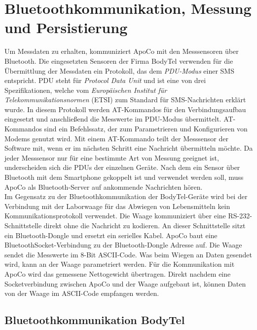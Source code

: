 

\section{Bluetoothkommunikation, Messung und Persistierung} 

Um Messdaten zu erhalten, kommuniziert ApoCo mit den Messsensoren \"uber Bluetooth.
Die eingesetzten Sensoren der Firma BodyTel verwenden f\"ur die \"Ubermittlung der Messdaten 
ein Protokoll, das dem \emph{PDU-Modus} einer SMS entspricht.
PDU steht f\"ur \emph{Protocol Data Unit} und ist eine von drei Spezifikationen, 
welche vom \emph{Europ\"aischen Institut f\"ur Telekommunikationsnormen} (ETSI)\cite{ETSI:01}
zum Standard f\"ur SMS-Nachrichten erkl\"art wurde.
In diesem Protokoll werden AT-Kommandos f\"ur den Verbindungsaufbau eingesetzt 
und anschlie\ss{}end die Messwerte im PDU-Modus \"ubermittelt. 
AT-Kommandos sind ein Befehlssatz, der zum Parametrieren und Konfigurieren von Modems genutzt wird\cite{AT-command:01}.
Mit einem AT-Kommando teilt der Messsensor der Software mit, wenn er im n\"achsten Schritt eine Nachricht \"ubermitteln m\"ochte.
Da jeder Messsensor nur f\"ur eine bestimmte Art von Messung geeignet ist, underscheiden sich die PDUs der einzelnen Ger\"ate.
Nach dem ein Sensor \"uber Bluetooth mit dem Smartphone gekoppelt ist und verwendet werden soll, muss ApoCo 
als Bluetooth-Server auf ankommende Nachrichten h\"oren.\\
Im Gegensatz zu der Bluetoothkommunikation der BodyTel-Ger\"ate wird bei der Verbindung mit der Laborwaage f\"ur das Abwiegen
von Lebensmitteln kein Kommunikationsprotokoll verwendet.
Die Waage kommuniziert \"uber eine RS-232-Schnittstelle direkt ohne die Nachricht zu kodieren.
An dieser Schnittstelle sitzt ein Bluetooth-Dongle und ersetzt ein serielles Kabel.
ApoCo baut eine BluetoothSocket-Verbindung zu der Bluetooth-Dongle Adresse auf.
Die Waage sendet die Messwerte im 8-Bit ASCII-Code. 
Was beim Wiegen an Daten gesendet wird, kann an der Waage parametriert werden.
F\"ur die Kommunikation mit ApoCo wird das gemessene Nettogewicht \"ubertragen.
Direkt nachdem eine Socketverbindung zwischen ApoCo und der Waage aufgebaut ist, 
k\"onnen Daten von der Waage im ASCII-Code empfangen werden.\\


\subsection{Bluetoothkommunikation BodyTel}

